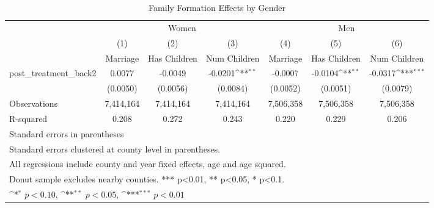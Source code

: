 \begin{table}[htbp]\centering
\def\sym#1{\ifmmode^{#1}\else\(^{#1}\)\fi}
\caption{Family Formation Effects by Gender}
\begin{tabular}{l*{6}{c}}
\hline\hline
            &\multicolumn{3}{c}{Women}                                        &\multicolumn{3}{c}{Men}                                          \\\cmidrule(lr){2-4}\cmidrule(lr){5-7}
            &\multicolumn{1}{c}{(1)}&\multicolumn{1}{c}{(2)}&\multicolumn{1}{c}{(3)}&\multicolumn{1}{c}{(4)}&\multicolumn{1}{c}{(5)}&\multicolumn{1}{c}{(6)}\\
            &\multicolumn{1}{c}{Marriage}&\multicolumn{1}{c}{Has Children}&\multicolumn{1}{c}{Num Children}&\multicolumn{1}{c}{Marriage}&\multicolumn{1}{c}{Has Children}&\multicolumn{1}{c}{Num Children}\\
\hline
post\_treatment\_back2&      0.0077         &     -0.0049         &     -0.0201\sym{**} &     -0.0007         &     -0.0104\sym{**} &     -0.0317\sym{***}\\
            &    (0.0050)         &    (0.0056)         &    (0.0084)         &    (0.0052)         &    (0.0051)         &    (0.0079)         \\
\hline
Observations&   7,414,164         &   7,414,164         &   7,414,164         &   7,506,358         &   7,506,358         &   7,506,358         \\
R-squared   &       0.208         &       0.272         &       0.243         &       0.220         &       0.229         &       0.206         \\
\hline\hline
\multicolumn{7}{l}{\footnotesize Standard errors in parentheses}\\
\multicolumn{7}{l}{\footnotesize Standard errors clustered at county level in parentheses.}\\
\multicolumn{7}{l}{\footnotesize All regressions include county and year fixed effects, age and age squared.}\\
\multicolumn{7}{l}{\footnotesize Donut sample excludes nearby counties. *** p<0.01, ** p<0.05, * p<0.1.}\\
\multicolumn{7}{l}{\footnotesize \sym{*} \(p<0.10\), \sym{**} \(p<0.05\), \sym{***} \(p<0.01\)}\\
\end{tabular}
\end{table}
